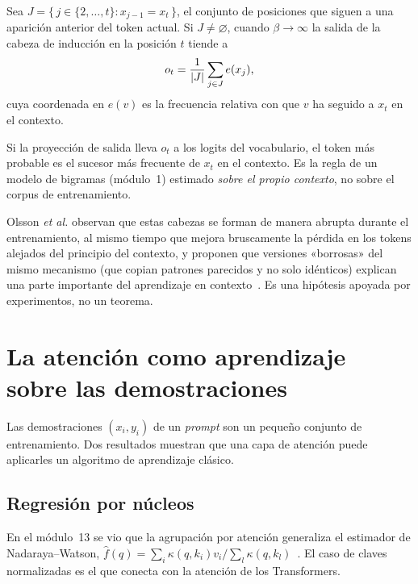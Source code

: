 \begin{proposicion}\label{prop:induccion}
Sea $J=\{\,j\in\{2,\dots,t\}:x_{j-1}=x_t\,\}$, el conjunto de posiciones que siguen a una aparición anterior del token actual. Si $J\ne\varnothing$, cuando $\beta\to\infty$ la salida de la cabeza de inducción en la posición $t$ tiende a
\[
o_t=\frac{1}{\lvert J\rvert}\sum_{j\in J}e(x_j),
\]
cuya coordenada en $e(v)$ es la frecuencia relativa con que $v$ ha seguido a $x_t$ en el contexto.
\end{proposicion}

Si la proyección de salida lleva $o_t$ a los logits del vocabulario, el token más probable es el sucesor más frecuente de $x_t$ en el contexto. Es la regla de un modelo de bigramas (módulo~1) estimado \emph{sobre el propio contexto}, no sobre el corpus de entrenamiento.

\addtocounter{definicion}{1}%

\addtocounter{figure}{1}%

\begin{observacion}
Olsson \emph{et al.} observan que estas cabezas se forman de manera abrupta durante el entrenamiento, al mismo tiempo que mejora bruscamente la pérdida en los tokens alejados del principio del contexto, y proponen que versiones «borrosas» del mismo mecanismo (que copian patrones parecidos y no solo idénticos) explican una parte importante del aprendizaje en contexto~\cite{olsson}. Es una hipótesis apoyada por experimentos, no un teorema.
\end{observacion}

\section{La atención como aprendizaje sobre las demostraciones}

Las demostraciones $(x_i,y_i)$ de un \emph{prompt} son un pequeño conjunto de entrenamiento. Dos resultados muestran que una capa de atención puede aplicarles un algoritmo de aprendizaje clásico.

\subsection{Regresión por núcleos}

En el módulo~13 se vio que la agrupación por atención generaliza el estimador de Nadaraya--Watson, $\hat f(q)=\sum_i\kappa(q,k_i)v_i/\sum_l\kappa(q,k_l)$~\cite[§11.2]{d2l}. El caso de claves normalizadas es el que conecta con la atención de los Transformers.

